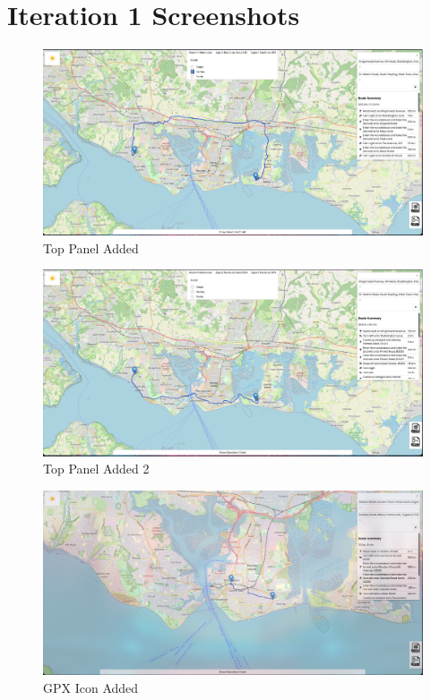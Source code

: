 \chapter{Iteration 1 Screenshots}

\begin{figure}[!ht]
    \centering
    \includegraphics[width=425px]{figures/Progress Images/Iteration-1/SR7/SR9 Top Panel added and Avoid functionality implemented Avoid Ferries Example.png}
    \caption{Top Panel Added}
    \label{fig:Top-Panel-added}
\end{figure}

\begin{figure}[!ht]
    \centering
    \includegraphics[width=425px]{figures/Progress Images/Iteration-1/SR7/SR9 Top Panel added and Avoid functionality implemented.png}
    \caption{Top Panel Added 2}
    \label{fig:Top-Panel-added2}
\end{figure}

\begin{figure}[!ht]
    \centering
    \includegraphics[width=425px]{figures/Progress Images/Iteration-1/SR12/SR13 GPX Icon Added (bottom right).png}
    \caption{GPX Icon Added}
    \label{fig:gpx-icon-added}
\end{figure}

